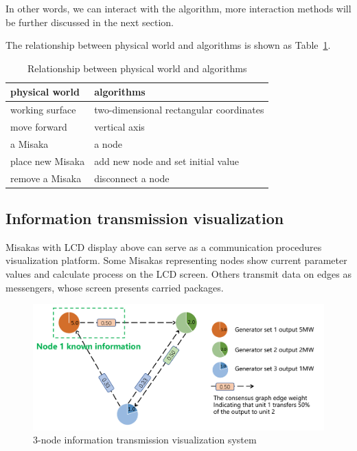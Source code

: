 \documentclass[conference]{IEEEtran}
\begin{document}
In other words, we can interact with the algorithm, more interaction methods will be further discussed in the next section.

The relationship between physical world and algorithms is shown as Table~\ref{tab:Real-Unreal}.

\begin{table}[htbp]
    \centering
    \caption{Relationship between physical world and algorithms}
    \begin{tabular}{@{}ll@{}}
    \hline
    \hline
    physical world          & algorithms                               \\ \hline
    working surface         & two-dimensional rectangular coordinates  \\
    move forward            & vertical axis                            \\
    a Misaka                & a node                                   \\
    place new Misaka        & add new node and set initial value       \\
    remove a Misaka         & disconnect a node                        \\ 
    \hline
    \hline
    \end{tabular}
    \label{tab:Real-Unreal}
\end{table}



\subsection{Information transmission visualization}


Misakas with LCD display above can serve as a communication procedures visualization platform. Some Misakas representing nodes show current parameter values and calculate process on the LCD screen. Others transmit data on edges as messengers, whose screen presents carried packages.

\begin{figure}[htbp]
    \centering
    \includegraphics[width=\columnwidth]{PPT0.png}
    \caption{3-node information transmission visualization system}
    \label{fig:PPT0}
\end{figure}
\end{document}
